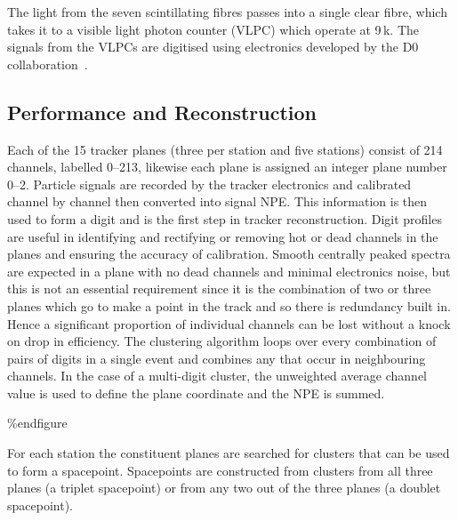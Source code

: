 The light from the seven scintillating fibres passes into a single clear fibre, which takes it to a visible light photon counter (VLPC) which operate at 9\,k. The signals from the VLPCs are digitised using electronics developed by the D0 collaboration~\cite{Abazov:2005pn}.


\subsection{Performance and Reconstruction}

Each of the 15 tracker planes (three per station and five stations) consist of 214 channels, labelled 0--213, likewise each plane is assigned an integer plane number 0--2. Particle signals are recorded by the tracker electronics and calibrated channel by channel then converted into signal NPE. This information is then used to form a digit and is the first step in tracker reconstruction.
Digit profiles are useful in identifying and rectifying or removing hot or dead channels in the planes and ensuring the accuracy of calibration.  Smooth centrally peaked spectra are expected in a plane with no dead channels and minimal electronics noise, but this is not an essential requirement since it is the combination of two or three planes which go to make a point in the track and so there is redundancy built in. Hence a significant proportion of individual channels can be lost without a knock on drop in efficiency. 
The clustering algorithm loops over every combination of pairs of digits in a single event and combines any that occur in neighbouring channels. In the case of a multi-digit cluster, the unweighted average channel value is used to define the plane coordinate and the NPE is summed.

\%end{figure}

For each station the constituent planes are searched for clusters that can be used to form a spacepoint.
Spacepoints are constructed from clusters from all three planes (a triplet spacepoint) or from any two out of the three planes (a doublet spacepoint).


